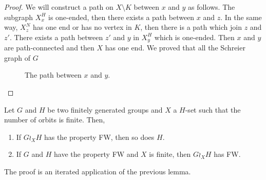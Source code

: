 \begin{proof}
We will construct a path on $X \setminus K$ between $x$ and $y$ as follows. The subgraph $X_x^H$ is one-ended, then there exists a path between $x$ and $z$. In the same way, $X_z^N$ has one end or has no vertex in $K$, then there is a path which join $z$ and $z'$. There exists a path between $z'$ and $y$ in $X_y^H$ which is one-ended. Then $x$ and $y$ are path-connected and then $X$ has one end. We proved that all the Schreier graph of $G$
\begin{figure}[H]\centering
\scalebox{0.7}{
}
\caption{The path between $x$ and $y$.}
\end{figure}\end{proof}

%
\begin{cor}\label{Cor:Wreath_ends}
Let $G$ and $H$ be two finitely generated groups and $X$ a $H$-set such that the number of orbits is finite. Then,
\begin{enumerate}
\item
If $G\wr_X H$ has the property FW, then so does $H$.
\item
If $G$ and $H$ have the property FW and $X$ is finite, then $G\wr_X H$ has FW.
\end{enumerate}
\end{cor}
%
%
The proof is an iterated application of the previous lemma.
%
%
